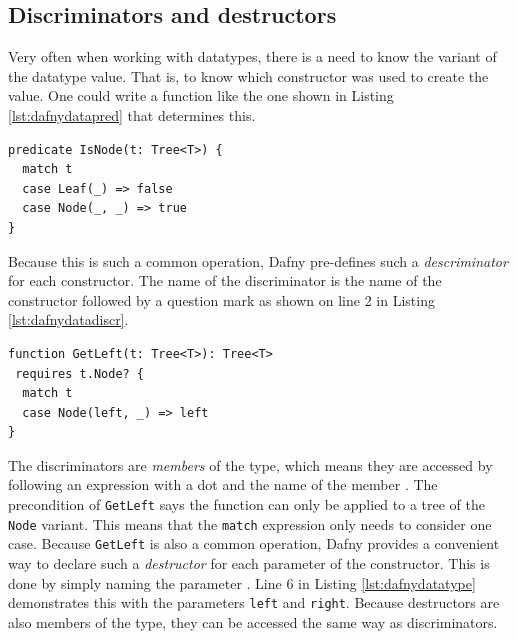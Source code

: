 \documentclass[a4paper]{article}
\begin{document}
\subsection{Discriminators and destructors}
Very often when working with datatypes, there is a need to know the variant of the datatype value. That is, to know
which constructor was used to create the value. One could write a function like the one shown in Listing \ref{lst:dafnydatapred}
that determines this.
\begin{lstlisting}[style=dafnystyle, caption={Predicate checking if the argument t is a Node.}, label={lst:dafnydatapred}]
predicate IsNode(t: Tree<T>) {
  match t
  case Leaf(_) => false
  case Node(_, _) => true
}
\end{lstlisting}
Because this is such a common operation, Dafny pre-defines such a \textit{descriminator} for each constructor.
The name of the discriminator is the name of the constructor followed by a question mark as shown on line 2
in Listing \ref{lst:dafnydatadiscr}.
\begin{lstlisting}[style=dafnystyle, caption={Function returning the left subtree of a tree.}, label={lst:dafnydatadiscr}]
function GetLeft(t: Tree<T>): Tree<T>
 requires t.Node? {
  match t
  case Node(left, _) => left
}
\end{lstlisting}
The discriminators are \textit{members} of the type, which means they are accessed by following an expression with a dot
and the name of the member \cite{leino2023program}. The precondition of \texttt{GetLeft} says the function can only be
applied to a tree of the \texttt{Node} variant. This means that the \texttt{match} expression only needs to consider
one case. Because \texttt{GetLeft} is also a common operation, Dafny provides a convenient way to declare such a
\textit{destructor} for each parameter of the constructor. This is done by simply naming the parameter \cite{leino2023program}.
Line 6 in Listing \ref{lst:dafnydatatype} demonstrates this with the parameters \texttt{left} and \texttt{right}.
Because destructors are also members of the type, they can be accessed the same way as discriminators.
\end{document}
